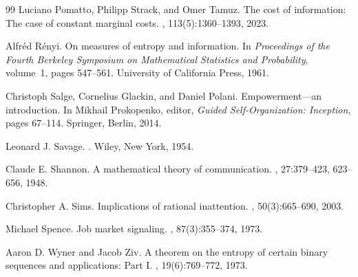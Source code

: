 \documentclass[11pt,a4paper]{article}
\theoremstyle{definition}
\newcommand{\1}{\mathbf 1}
\begin{document}
\begin{thebibliography}{99}
Luciano Pomatto, Philipp Strack, and Omer Tamuz.
\newblock The cost of information: The case of constant marginal costs.
, 113(5):1360--1393, 2023.

Alfr\'ed R\'enyi.
\newblock On measures of entropy and information.
\newblock In {\em Proceedings of the Fourth Berkeley Symposium on Mathematical Statistics and Probability}, volume~1,
  pages 547--561. University of California Press, 1961.

Christoph Salge, Cornelius Glackin, and Daniel Polani.
\newblock Empowerment---an introduction.
\newblock In Mikhail Prokopenko, editor, {\em Guided Self-Organization: Inception}, pages 67--114. Springer, Berlin,
  2014.

Leonard J. Savage.
.
\newblock Wiley, New York, 1954.

Claude E. Shannon.
\newblock A mathematical theory of communication.
, 27:379--423, 623--656, 1948.

Christopher A. Sims.
\newblock Implications of rational inattention.
, 50(3):665--690, 2003.

Michael Spence.
\newblock Job market signaling.
, 87(3):355--374, 1973.

Aaron D. Wyner and Jacob Ziv.
\newblock A theorem on the entropy of certain binary sequences and applications: Part {I}.
, 19(6):769--772, 1973.

\end{thebibliography}
\end{document}
